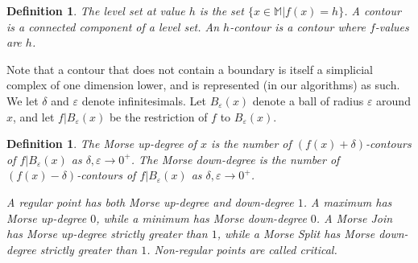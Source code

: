 \documentclass[11pt]{article}
\newtheorem{definition}[theorem]{Definition}
\theoremstyle{definition}
\newcommand{\MM}{\mathbb{M}}
\newcommand{\eps}{\varepsilon}
\begin{document}
\begin{definition} \label{def:level} The \emph{level set} at value $h$ is the set $\{x\in \MM| f(x) = h\}$.
A \emph{contour} is a connected component of a level set. An \emph{$h$-contour} is a contour where $f$-values are $h$.
\end{definition}

Note that a contour that does not contain a boundary is itself a simplicial complex of one dimension lower, and is represented (in our algorithms) as such.
We let $\delta$ and $\eps$ denote infinitesimals. Let $B_\eps(x)$ denote a ball of radius $\eps$ around $x$, and let 
$f|B_\eps(x)$ be the restriction of $f$ to $B_\eps(x)$.


\begin{definition} \label{def:deg} The \emph{Morse up-degree} of $x$ is the number of $(f(x) + \delta)$-contours of $f|B_\eps(x)$
as $\delta, \eps \rightarrow 0^+$. The \emph{Morse down-degree} is the number of $(f(x) - \delta)$-contours of $f|B_\eps(x)$
as $\delta, \eps \rightarrow 0^+$.

A \emph{regular} point has both Morse up-degree and down-degree $1$. A \emph{maximum} has Morse up-degree $0$, while
a \emph{minimum} has Morse down-degree $0$. A \emph{Morse Join} has Morse up-degree strictly greater than $1$,
while a \emph{Morse Split} has Morse down-degree strictly greater than $1$. Non-regular points are called \emph{critical}.
\end{definition}

% 
% 
\end{document}

